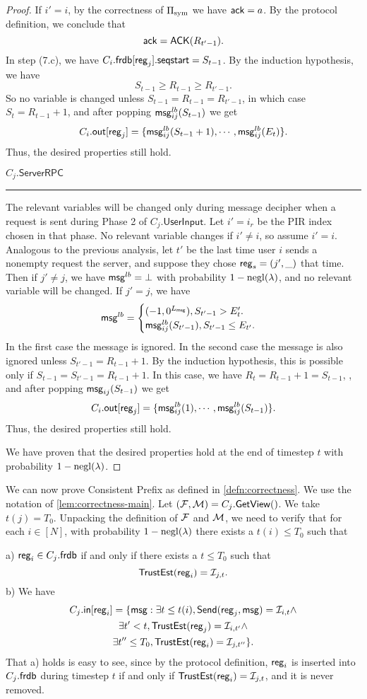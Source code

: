 \begin{proof}
If $i' = i$, by the correctness of $\Pi_{\text{sym}}$ we have $\mathsf{ack} = a$. By the protocol definition, we conclude that
$$\mathsf{ack} = \mathsf{ACK}(R_{t' - 1}).$$
In step (7.c), we have $C_i.\mathsf{frdb}[\mathsf{reg}_j].\mathsf{seqstart} = S_{t - 1}$. By the induction hypothesis, we have
$$S_{t - 1} \geq R_{t - 1} \geq R_{t' - 1}.$$
So no variable is changed unless $S_{t - 1} = R_{t - 1} = R_{t' - 1}$, in which case $S_t = R_{t - 1} + 1$, and after popping $\mathsf{msg}^{lb}_{ij}(S_{t - 1})$ we get
$$C_i.\mathsf{out}[\mathsf{reg}_j] = \{\mathsf{msg}^{lb}_{ij}(S_{t - 1} + 1), \cdots, \mathsf{msg}^{lb}_{ij}(E_t)\}.$$
Thus, the desired properties still hold.

\vspace{10pt}
$C_j.\mathsf{ServerRPC}$
\hrule
The relevant variables will be changed only during message decipher when a request is sent during Phase 2 of $C_j.\mathsf{UserInput}$. Let $i' = i_r$ be the PIR index chosen in that phase. No relevant variable changes if $i' \neq i$, so assume $i' = i$. Analogous to the previous analysis, let $t'$ be the last time user $i$ sends a nonempty request the server, and suppose they chose $\mathsf{reg}_s = (j', \_)$ that time. Then
if $j' \neq j$, we have $\mathsf{msg}^{lb} = \bot$ with probability $1 - \operatorname{negl}(\lambda)$, and no relevant variable will be changed. If $j' = j$, we have
$$\mathsf{msg}^{lb} = \begin{cases}
(-1, 0^{L_{\mathsf{msg}}}), S_{t' - 1} > E_t'. \\
\mathsf{msg}_{ij}^{lb}(S_{t' - 1}), S_{t' - 1} \leq E_{t'}. 
\end{cases}$$
In the first case the message is ignored. In the second case the message is also ignored unless $S_{t' - 1} = R_{t - 1} + 1$. By the induction hypothesis, this is possible only if $S_{t - 1} = S_{t' - 1} = R_{t - 1} + 1$. In this case, we have $R_t = R_{t - 1} + 1 = S_{t - 1}$, , and after popping $\mathsf{msg}_{ij}(S_{t - 1})$ we get
$$C_i.\mathsf{out}[\mathsf{reg}_j] = \{\mathsf{msg}^{lb}_{ij}(1), \cdots, \mathsf{msg}^{lb}_{ij}(S_{t - 1})\}.$$
Thus, the desired properties still hold.

We have proven that the desired properties hold at the end of timestep $t$ with probability $1 - \operatorname{negl}(\lambda)$.
\end{proof}
We can now prove Consistent Prefix as defined in \cref{defn:correctness}. We use the notation of \cref{lem:correctness-main}. Let $(\mathcal{F}, \mathcal{M}) = C_j.\mathsf{GetView}()$. We take $t(j) = T_0$. Unpacking the definition of $\mathcal{F}$ and $\mathcal{M}$, we need to verify that for each $i \in [N]$, with probability $1 - \operatorname{negl}(\lambda)$ there exists a $t(i) \leq T_0$ such that
 
 a) $\mathsf{reg}_i \in C_j.\mathsf{frdb}$ if and only if there exists a $t \leq T_0$ such that 
 $$\mathsf{TrustEst}(\mathsf{reg}_i) = \mathcal{I}_{j, t}.$$
 b) We have
 \begin{multline*}
 C_j.\mathsf{in}[\mathsf{reg}_i] = \{\mathsf{msg}: \exists t \leq t(i), \mathsf{Send}(\mathsf{reg}_j, \mathsf{msg}) = \mathcal{I}_{i, t} \land \\
 \exists t' < t, \mathsf{TrustEst}(\mathsf{reg}_j) = \mathcal{I}_{i, t'} \land \\
 \exists t'' \leq T_0, \mathsf{TrustEst}(\mathsf{reg}_i) = \mathcal{I}_{j, t''}\}.   
 \end{multline*} 
 That a) holds is easy to see, since by the protocol definition, $\mathsf{reg}_i$ is inserted into $C_j.\mathsf{frdb}$ during timestep $t$ if and only if $\mathsf{TrustEst}(\mathsf{reg}_i) = \mathcal{I}_{j, t}$, and it is never removed. 
 
